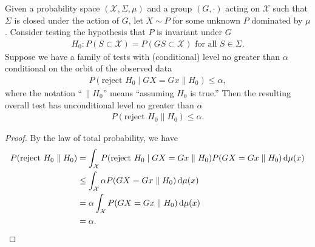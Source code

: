 \begin{thm}
Given a probability space $(\mathcal{X}, \Sigma, \mu)$ and a group $(G, \cdot)$
acting on $\mathcal{X}$ such that $\Sigma$ is closed under the action of $G$,  
let $X \sim P$ for some unknown $P$ dominated by $\mu$.
Consider testing the hypothesis that $P$ is invariant under $G$
\begin{align*}
H_0: P(S \subset \mathcal{X}) = P(GS  \subset \mathcal{X}) \text{  for all }S \in \Sigma.
\end{align*}
Suppose we have a family of tests with (conditional) level no greater than $\alpha$ conditional on the orbit of
the observed data
\begin{align*}
P(\text{reject }H_0 \mid GX=Gx \parallel H_0) \le \alpha,
\end{align*}
where the notation ``$\, \parallel H_0$'' means ``assuming $H_0$ is true.''
Then the resulting overall test has unconditional level no greater than $\alpha$
\begin{align*}
P(\text{reject }H_0  \parallel H_0) \le \alpha.
\end{align*}
\end{thm}

\begin{proof}
By the law of total probability, we have
\begin{align*}
P(\text{reject }H_0  \parallel H_0) &= \int_\mathcal{X} P(\text{reject }H_0  \mid GX=Gx \parallel H_0)P(GX=Gx \parallel H_0) \mathop{}\!\mathrm{d} \mu(x) \\
  &\le \int_\mathcal{X} \alpha P(GX=Gx \parallel H_0) \mathop{}\!\mathrm{d} \mu(x) \\
  &= \alpha \int_\mathcal{X} P(GX=Gx \parallel H_0) \mathop{}\!\mathrm{d} \mu(x) \\
  &= \alpha.  \qedhere
\end{align*}
\end{proof}
